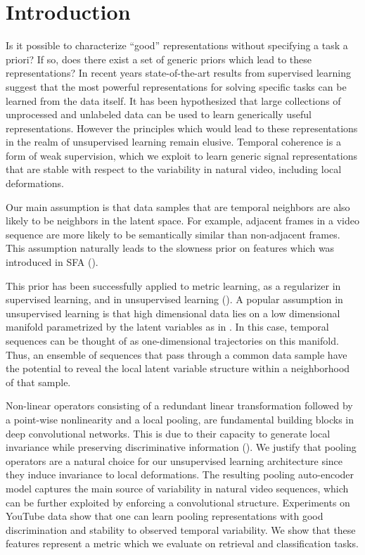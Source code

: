 \section{Introduction} Is it possible to characterize ``good'' representations
without specifying a task a priori? If so, does there exist a set of generic
priors which lead to these representations? In recent years state-of-the-art
results from supervised learning suggest that the most powerful representations
for solving specific tasks can be learned from the data itself. It has been
hypothesized that large collections of unprocessed and unlabeled data can be
used to learn generically useful representations. However the principles which
would lead to these representations in the realm of unsupervised learning
remain elusive. Temporal coherence is a form of weak supervision, which we
exploit to learn generic signal representations that are stable with respect to
the variability in natural video, including local deformations. 

Our main assumption is that data samples that are temporal neighbors are also
likely to be neighbors in the latent space. For example, adjacent frames in a
video sequence are more likely to be semantically similar than non-adjacent
frames. This assumption naturally leads to the slowness prior on features which
was introduced in SFA (\cite{SFA}). 

This prior has been successfully applied to metric learning, as a regularizer
in supervised learning, and in unsupervised learning
(\cite{DrLIM,DrLIMVideo,SFA}). A popular assumption in unsupervised learning is
that high dimensional data lies on a low dimensional manifold  parametrized by
the latent variables as in \cite{Bengio2012,CAE,DAE,SATAE}. In this case,
temporal sequences can be thought of as one-dimensional trajectories on this
manifold. Thus, an ensemble of sequences that pass through a common data sample
have the potential to reveal the local latent variable structure within a
neighborhood of that sample. 

Non-linear operators consisting of a redundant linear transformation followed
by a point-wise nonlinearity and a local pooling, are fundamental building
blocks in deep convolutional networks. This is due to their capacity to
generate local invariance while preserving discriminative information
(\cite{LeCun1998, JoanScat}). We justify that pooling operators are a natural
choice for our unsupervised learning architecture since they induce invariance
to local deformations. The resulting pooling auto-encoder model captures the
main source of variability in natural video sequences, which can be further
exploited by enforcing a convolutional structure. Experiments on YouTube data
show that one can learn pooling representations with good discrimination and
stability to observed temporal variability. We show that these features
represent a metric which we evaluate on retrieval and classification tasks. 

